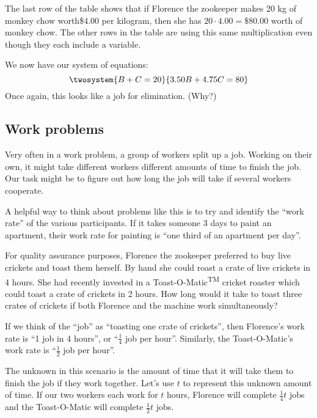 The last row of the table shows that if Florence the zookeeper makes 20 kg of monkey chow worth\$4.00 per kilogram, then she has $20 \cdot 4.00 = \$80.00$ worth of monkey chow. The other rows in the table are using this same multiplication even though they each include a variable.

We now have our system of equations:
\[\twosystem{B+C=20}{3.50B + 4.75C = 80}\]
Once again, this looks like a job for elimination. (Why?)

\subsection{Work problems}

Very often in a work problem, a group of workers split up a job. Working on their own, it might take different workers different amounts of time to finish the job. Our task might be to figure out how long the job will take if several workers cooperate.

A helpful way to think about problems like this is to try and identify the ``work rate'' of the various participants. If it takes someone 3 days to paint an apartment, their work rate for painting is ``one third of an apartment per day''.


\begin{boxex}
For quality assurance purposes, Florence the zookeeper preferred to buy live crickets and toast them herself. By hand she could roast a crate of live crickets in 4 hours. She had recently invested in a Toast-O-Matic\textsuperscript{TM} cricket roaster which could toast a crate of crickets in 2 hours. How long would it take to toast three crates of crickets if both Florence and the machine work simultaneously?
\end{boxex}

If we think of the ``job'' as ``toasting one crate of crickets'', then Florence's work rate is ``1 job in 4 hours'', or ``$\frac{1}{4}$ job per hour''. Similarly, the Toast-O-Matic's work rate is ``$\frac{1}{2}$ job per hour''.

The unknown in this scenario is the amount of time that it will take them to finish the job if they work together. Let's use $t$ to represent this unknown amount of time. If our two workers each work for $t$ hours, Florence will complete $\frac{1}{4}t$ jobs and the Toast-O-Matic will complete $\frac{1}{2}t$ jobs.

